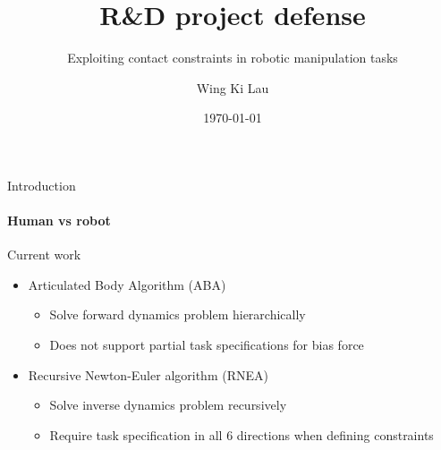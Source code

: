 \documentclass[aspectratio=169]{beamer}
\author[Lau]{Wing Ki Lau}
\title{R\&D project defense}
\subtitle{Exploiting contact constraints in robotic manipulation tasks}
\institute[HBRS]{Hochschule Bonn-Rhein-Sieg}
\date{\today}
\begin{document}
{
\begin{frame}
\titlepage
\end{frame}
}


\begin{frame}{Introduction}
    \framesubtitle{Human vs robot}
    \begin{figure}
      \hspace{0.5em}
    \end{figure}
\end{frame}


\begin{frame}{Current work}
  \begin{itemize}
    \item Articulated Body Algorithm (ABA)
    \begin{itemize}
      \item Solve forward dynamics problem hierarchically \cite{featherstone1983calculation}
      \item Does not support partial task specifications for bias force 
    \end{itemize}
    \item Recursive Newton-Euler algorithm (RNEA)
    \begin{itemize}
      \item Solve inverse dynamics problem recursively \cite{featherstone2007book} \cite{featherstone1999divide}
      \item Require task specification in all 6 directions when defining constraints
    \end{itemize}
\end{itemize}
\end{frame}
\end{document}
